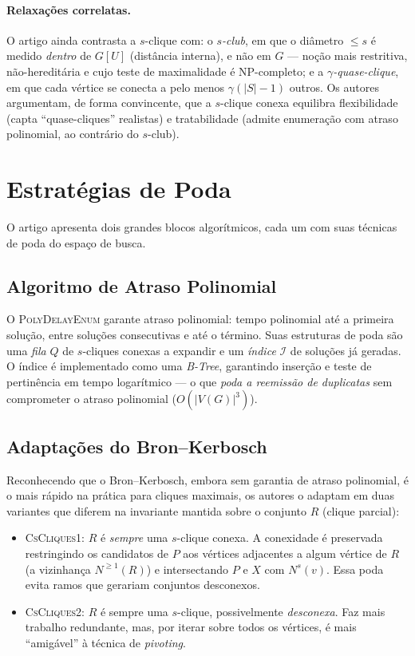 \documentclass[12pt]{article}
\begin{document}
\paragraph{Relaxações correlatas.} O artigo ainda contrasta a $s$-clique com:
o \emph{$s$-club}, em que o diâmetro $\leq s$ é medido \emph{dentro} de $G[U]$
(distância interna), e não em $G$ --- noção mais restritiva, não-hereditária e
cujo teste de maximalidade é NP-completo; e a \emph{$\gamma$-quase-clique}, em
que cada vértice se conecta a pelo menos $\gamma(|S|-1)$ outros. Os autores
argumentam, de forma convincente, que a $s$-clique conexa equilibra
flexibilidade (capta ``quase-cliques'' realistas) e tratabilidade (admite
enumeração com atraso polinomial, ao contrário do $s$-club).

\section{Estratégias de Poda}

O artigo apresenta dois grandes blocos algorítmicos, cada um com suas técnicas de
poda do espaço de busca.

\subsection{Algoritmo de Atraso Polinomial}

O \textsc{PolyDelayEnum} garante atraso polinomial: tempo polinomial até a
primeira solução, entre soluções consecutivas e até o término. Suas estruturas de
poda são uma \emph{fila} $Q$ de $s$-cliques conexas a expandir e um
\emph{índice} $\mathcal{I}$ de soluções já geradas. O índice é implementado como
uma \emph{B-Tree}, garantindo inserção e teste de pertinência em tempo
logarítmico --- o que \emph{poda a reemissão de duplicatas} sem comprometer o
atraso polinomial ($O(|V(G)|^3)$).

\subsection{Adaptações do Bron--Kerbosch}

Reconhecendo que o Bron--Kerbosch, embora sem garantia de atraso polinomial, é o
mais rápido na prática para cliques maximais, os autores o adaptam em duas
variantes que diferem na invariante mantida sobre o conjunto $R$ (clique
parcial):

\begin{itemize}
  \item \textsc{CsCliques1}: $R$ é \emph{sempre} uma $s$-clique conexa. A
  conexidade é preservada restringindo os candidatos de $P$ aos vértices
  adjacentes a algum vértice de $R$ (a vizinhança $N^{\geq 1}(R)$) e intersectando
  $P$ e $X$ com $N^s(v)$. Essa poda evita ramos que gerariam conjuntos
  desconexos.
  \item \textsc{CsCliques2}: $R$ é sempre uma $s$-clique, possivelmente
  \emph{desconexa}. Faz mais trabalho redundante, mas, por iterar sobre todos os
  vértices, é mais ``amigável'' à técnica de \emph{pivoting}.
\end{itemize}
\end{document}

